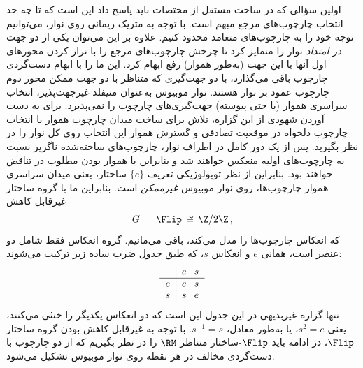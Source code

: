 اولین سؤالی که در ساخت \CNN مستقل از مختصات باید پاسخ داد این است که تا چه حد انتخاب چارچوب‌های مرجع مبهم است.
با توجه به متریک ریمانی روی نوار، می‌توانیم توجه خود را به چارچوب‌های متعامد محدود کنیم.
علاوه بر این می‌توان یکی از دو جهت \emph{در امتداد} نوار را متمایز کرد تا چرخش چارچوب‌های مرجع را با تراز کردن محورهای اول آنها با این جهت (به‌طور هموار) رفع ابهام کرد.
این ما را با ابهام دست‌گردی چارچوب باقی می‌گذارد، با دو جهت‌گیری که متناظر با دو جهت ممکن محور دوم چارچوب عمود بر نوار هستند.
نوار موبیوس به‌عنوان منیفلد غیرجهت‌پذیر، انتخاب سراسری هموار (یا حتی پیوسته) جهت‌گیری‌های چارچوب را نمی‌پذیرد.
برای به دست آوردن شهودی از این گزاره، تلاش برای ساخت میدان چارچوب هموار با انتخاب چارچوب دلخواه در موقعیت تصادفی و گسترش هموار این انتخاب روی کل نوار را در نظر بگیرید.
پس از یک دور کامل در اطراف نوار، چارچوب‌های ساخته‌شده ناگزیر نسبت به چارچوب‌های اولیه منعکس خواهند شد و بنابراین با هموار بودن مطلوب در تناقض خواهند بود.
بنابراین از نظر توپولوژیکی تعریف $\{e\}$-ساختار، یعنی میدان سراسری هموار چارچوب‌ها، روی نوار موبیوس \emph{غیرممکن} است.
بنابراین ما با گروه ساختار غیرقابل کاهش
\begin{align}
	G \,=\, \Flip \,\cong\, \Z/2\Z \,,
\end{align}
که انعکاس چارچوب‌ها را مدل می‌کند، باقی می‌مانیم.
گروه انعکاس فقط شامل دو عنصر است، همانی $e$ و انعکاس $s$، که طبق جدول ضرب ساده زیر ترکیب می‌شوند:
\begin{align}\label{eq:reflection_multiplication_table}
	\begin{tabular}{c|c@{\hspace{8pt}}c}
		& $e$ & $s$ \\ \hline
		$e$ & $e$ & $s$ \\
		$s$ & $s$ & $e$
	\end{tabular}
\end{align}
تنها گزاره غیربدیهی در این جدول این است که دو انعکاس یکدیگر را خنثی می‌کنند، یعنی $s^2=e$، یا به‌طور معادل، $s^{-1}=s$.
با توجه به غیرقابل کاهش بودن گروه ساختار $\Flip$، در ادامه باید $\Flip$-ساختار متناظر $\RM$ را در نظر بگیریم که از دو چارچوب با دست‌گردی مخالف در هر نقطه روی نوار موبیوس تشکیل می‌شود.


